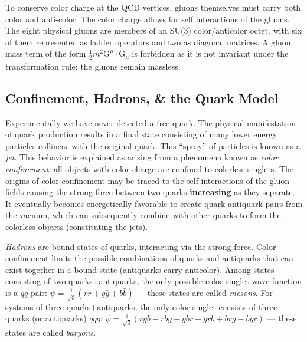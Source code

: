 To conserve color charge at the QCD vertices, gluons themselves must carry both color and anti-color. The color charge allows for self interactions of the gluons. The eight physical gluons are members of an SU(3) color/anticolor octet, with six of them represented as ladder operators and two as diagonal matrices. A gluon mass term of the form $\frac{1}{2}m^{2}\bm{\mathrm{G}}^{\mu} \cdot \bm{\mathrm{G}}_{\mu}$ is forbidden as it is not invariant under the transformation rule; the gluons remain massless.

\subsection{Confinement, Hadrons, \& the Quark Model}

Experimentally we have never detected a free quark. The physical manifestation of quark production results in a final state consisting of many lower energy particles collinear with the original quark. This ``spray'' of particles is known as a \textit{jet}. This behavior is explained as arising from a phenomena known as \textit{color confinement}: all objects with color charge are confined to colorless singlets. The origins of color confinement may be traced to the self interactions of the gluon fields causing the strong force between two quarks \textbf{increasing} as they separate. It eventually becomes energetically favorable to create quark-antiquark pairs from the vacuum, which can subsequently combine with other quarks to form the colorless objects (constituting the jets).

\textit{Hadrons} are bound states of quarks, interacting via the strong force. Color confinement limits the possible combinations of quarks and antiquarks that can exist together in a bound state (antiquarks carry anticolor). Among states consisting of two quarks+antiquarks, the only possible color singlet wave function is a $q\bar{q}$ pair: $\psi = \frac{1}{\sqrt{3}} (r\bar{r} + g\bar{g} + b\bar{b})$ --- these states are called \textit{mesons}. For systems of three quarks+antiquarks, the only color singlet consists of three quarks (or antiquarks) $qqq$: $\psi = \frac{1}{\sqrt{6}} (rgb - rbg + gbr - grb +brg-bgr)$ --- these states are called \textit{baryons}.

